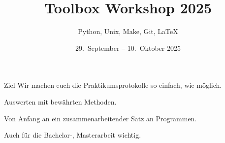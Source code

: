 

\title[Toolbox 2025]{Toolbox Workshop 2025}
\subtitle{Python, Unix, Make, Git, \LaTeX{}}
\date{29.~September – 10.~Oktober 2025}
\author[Toolbox Workshop Team]{}



\maketitle

\begin{frame}{Ziel}
  \setlength\parskip{3ex}
  \huge
  Wir machen euch die Praktikumsprotokolle so einfach, wie möglich.

  Auswerten mit bewährten Methoden.

  Von Anfang an ein zusammenarbeitender Satz an Programmen.

  Auch für die Bachelor-, Masterarbeit wichtig.
\end{frame}

